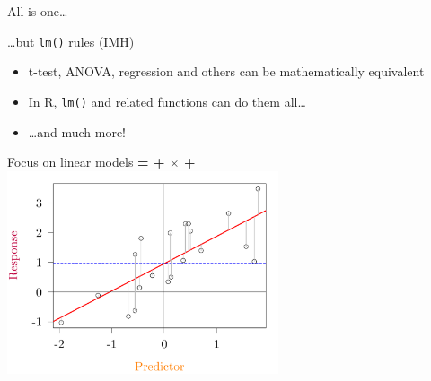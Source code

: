 \documentclass{beamer}
\begin{document}
\begin{frame}{All is one\dots}
\pause
  \begin{block}{\dots but \texttt{lm()} rules (IMH)}
    \begin{itemize}
      \item t-test, ANOVA, regression and others can be mathematically equivalent
      \item In R, \texttt{lm()} and related functions can do them all\dots
      \item \dots and much more!
    \end{itemize}
  \end{block}
\end{frame}


\begin{frame}{Focus on linear models}
  \textbf{{\color{purple}{Response}} = {\color{blue}{Intercept}} + {\color{red}{Slope}} $\times$ {\color{orange}{Predictor}} + {\color{gray}{Error}}} \\

\centering
\includegraphics[width=0.6\textwidth]{Figures/figure/lmprinc-1}
\end{frame}
\end{document}
